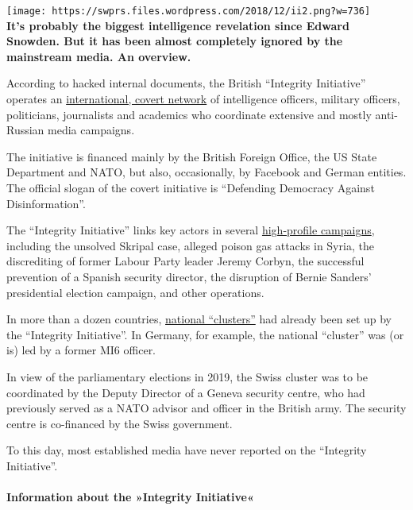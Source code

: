\texttt{[image: https://swprs.files.wordpress.com/2018/12/ii2.png?w=736]}\\
\textbf{It's probably the biggest intelligence revelation since Edward
Snowden. But it has been almost completely ignored by the mainstream
media. An overview.}

According to hacked internal documents, the British ``Integrity
Initiative'' operates an
\href{https://thegrayzone.com/2018/12/17/inside-the-temple-of-covert-propaganda-the-integrity-initiative-and-the-uks-scandalous-information-war/}{international,
covert network} of intelligence officers, military officers,
politicians, journalists and academics who coordinate extensive and
mostly anti-Russian media campaigns.

The initiative is financed mainly by the British Foreign Office, the US
State Department and NATO, but also, occasionally, by Facebook and
German entities. The official slogan of the covert initiative is
``Defending Democracy Against Disinformation''.

The ``Integrity Initiative'' links key actors in several
\href{http://syriapropagandamedia.org/working-papers/briefing-note-on-the-integrity-initiative}{high-profile
campaigns}, including the unsolved Skripal case, alleged poison gas
attacks in Syria, the discrediting of former Labour Party leader Jeremy
Corbyn, the successful prevention of a Spanish security director, the
disruption of Bernie Sanders' presidential election campaign, and other
operations.

In more than a dozen countries,
\href{https://www.pdf-archive.com/2018/11/02/xcountry/xcountry.pdf}{national
``clusters''} had already been set up by the ``Integrity Initiative''.
In Germany, for example, the national ``cluster'' was (or is) led by a
former MI6 officer.

In view of the parliamentary elections in 2019, the Swiss cluster was to
be coordinated by the Deputy Director of a Geneva security centre, who
had previously served as a NATO advisor and officer in the British army.
The security centre is co-financed by the Swiss government.

To this day, most established media have never reported on the
``Integrity Initiative''.

\hypertarget{information-about-the-integrity-initiative}{%
\paragraph{Information about the »Integrity
Initiative«}\label{information-about-the-integrity-initiative}}

